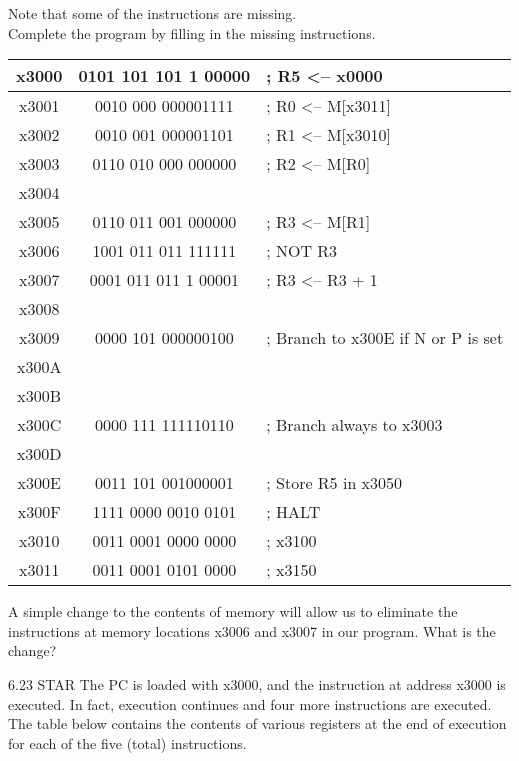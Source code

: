 \documentclass{patt}
\begin{document}
\begin{exercises}
\noindent
Note that some of the instructions are missing. \\

\noindent
Complete the program by filling in the missing instructions. \\

\vspace{0.1in}
\noindent
\begin{tabular} { |c|c|l| }
  \hline
  x3000 & 0101 101 101 1 00000  &; R5 \textless-- x0000 \\
  \hline
  x3001 & 0010 000 000001111    &; R0 \textless-- M[x3011] \\
  \hline
  x3002 & 0010 001 000001101    &; R1 \textless-- M[x3010] \\
  \hline
  x3003 & 0110 010 000 000000   &; R2 \textless-- M[R0] \\
  \hline
  x3004 &    & \\
  \hline
  x3005 & 0110 011 001 000000   &; R3 \textless-- M[R1] \\
  \hline
  x3006 & 1001 011 011 111111   &; NOT R3 \\
  \hline
  x3007 & 0001 011 011 1 00001  &; R3 \textless-- R3 + 1 \\
  \hline
  x3008 & & \\
  \hline
  x3009 & 0000 101 000000100    &; Branch to x300E if N or P is set \\
  \hline
  x300A & & \\
  \hline
  x300B & & \\
  \hline
  x300C & 0000 111 111110110    &; Branch always to x3003 \\
  \hline
  x300D & & \\
  \hline
  x300E & 0011 101 001000001    &; Store R5 in x3050 \\
  \hline
  x300F & 1111 0000 0010 0101   &; HALT \\
  \hline
  x3010 & 0011 0001 0000 0000   &; x3100 \\
  \hline
  x3011 & 0011 0001 0101 0000   &; x3150 \\
  \hline
\end{tabular}

\vspace{0.15in}
A simple change to the contents of memory will allow us to
eliminate the instructions at memory locations x3006 and x3007 in our
program. What is the change? \\

\item[6.23] STAR The PC is loaded with x3000, and the instruction
at address x3000 is executed.  In fact, execution continues and four more
instructions are executed.  The table below contains the contents of various
registers at the end of execution for each of the five (total) instructions. \\


\end{exercises}
\end{document}
